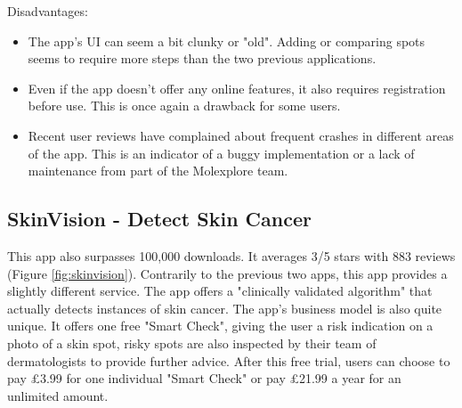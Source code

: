 Disadvantages:
\begin{itemize}
    \item The app's UI can seem a bit clunky or "old". Adding or comparing spots seems to require more steps than the two previous applications.
    \item Even if the app doesn't offer any online features, it also requires registration before use. This is once again a drawback for some users.
    \item Recent user reviews have complained about frequent crashes in different areas of the app. This is an indicator of a buggy implementation or a lack of maintenance from part of the Molexplore team.
\end{itemize}

\subsection{SkinVision - Detect Skin Cancer}
This app also surpasses 100,000 downloads. It averages 3/5 stars with 883 reviews (Figure \ref{fig:skinvision}). Contrarily to the previous two apps, this app provides a slightly different service. The app offers a "clinically validated algorithm" that actually detects instances of skin cancer. The app's business model is also quite unique. It offers one free "Smart Check", giving the user a risk indication on a photo of a skin spot, risky spots are also inspected by their team of dermatologists to provide further advice. After this free trial, users can choose to pay \pounds3.99 for one individual "Smart Check" or pay \pounds21.99 a year for an unlimited amount.
